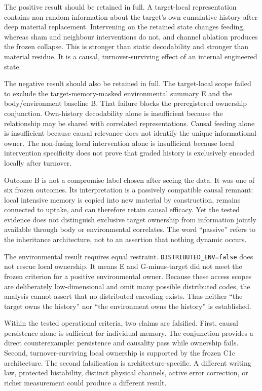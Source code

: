 \documentclass[11pt]{article}
\newcommand{\code}[1]{\texttt{#1}}
\begin{document}
The positive result should be retained in full. A target-local representation contains non-random information about the target's own cumulative history after deep material replacement. Intervening on the retained state changes feeding, whereas sham and neighbour interventions do not, and channel ablation produces the frozen collapse. This is stronger than static decodability and stronger than material residue. It is a causal, turnover-surviving effect of an internal engineered state.

The negative result should also be retained in full. The target-local scope failed to exclude the target-memory-masked environmental summary E and the body/environment baseline B. That failure blocks the preregistered ownership conjunction. Own-history decodability alone is insufficient because the relationship may be shared with correlated representations. Causal feeding alone is insufficient because causal relevance does not identify the unique informational owner. The non-fusing local intervention alone is insufficient because local intervention specificity does not prove that graded history is exclusively encoded locally after turnover.

Outcome B is not a compromise label chosen after seeing the data. It was one of six frozen outcomes. Its interpretation is a passively compatible causal remnant: local intensive memory is copied into new material by construction, remains connected to uptake, and can therefore retain causal efficacy. Yet the tested evidence does not distinguish exclusive target ownership from information jointly available through body or environmental correlates. The word ``passive'' refers to the inheritance architecture, not to an assertion that nothing dynamic occurs.

The environmental result requires equal restraint. \code{DISTRIBUTED\_ENV=false} does not rescue local ownership. It means E and G-minus-target did not meet the frozen criterion for a positive environmental owner. Because these access scopes are deliberately low-dimensional and omit many possible distributed codes, the analysis cannot assert that no distributed encoding exists. Thus neither ``the target owns the history'' nor ``the environment owns the history'' is established.

Within the tested operational criteria, two claims are falsified. First, causal persistence alone is sufficient for individual memory. The conjunction provides a direct counterexample: persistence and causality pass while ownership fails. Second, turnover-surviving local ownership is supported by the frozen C1c architecture. The second falsification is architecture-specific. A different writing law, protected bistability, distinct physical channels, active error correction, or richer measurement could produce a different result.
\end{document}
